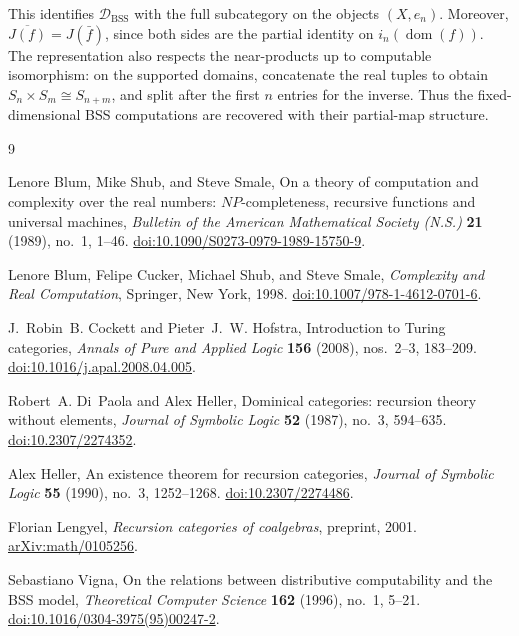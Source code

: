 \documentclass[11pt]{article}
\newcommand{\D}{\mathcal D_{\mathrm{BSS}}}
\newcommand{\dom}{\operatorname{dom}}
\begin{document}
This identifies $\D$ with the full subcategory on the objects
$(X,e_n)$. Moreover,
$\overline{J(f)}=J(\bar f)$, since both sides are the partial
identity on $i_n(\dom(f))$.
The representation also respects the near-products up to
computable isomorphism: on the supported domains, concatenate the
real tuples to obtain $S_n\times S_m\cong S_{n+m}$, and split after
the first $n$ entries for the inverse. Thus the fixed-dimensional
BSS computations are recovered with their partial-map structure.

\begin{thebibliography}{9}
\small
\setlength{\itemsep}{3pt}

Lenore Blum, Mike Shub, and Steve Smale,
On a theory of computation and complexity over the real numbers:
$NP$-completeness, recursive functions and universal machines,
\emph{Bulletin of the American Mathematical Society (N.S.)}
\textbf{21} (1989), no.~1, 1--46.
\href{https://doi.org/10.1090/S0273-0979-1989-15750-9}{doi:10.1090/S0273-0979-1989-15750-9}.

Lenore Blum, Felipe Cucker, Michael Shub, and Steve Smale,
\emph{Complexity and Real Computation},
Springer, New York, 1998.
\href{https://doi.org/10.1007/978-1-4612-0701-6}{doi:10.1007/978-1-4612-0701-6}.

J.~Robin~B. Cockett and Pieter~J.~W. Hofstra,
Introduction to Turing categories,
\emph{Annals of Pure and Applied Logic}
\textbf{156} (2008), nos.~2--3, 183--209.
\href{https://doi.org/10.1016/j.apal.2008.04.005}{doi:10.1016/j.apal.2008.04.005}.

Robert~A. Di~Paola and Alex Heller,
Dominical categories: recursion theory without elements,
\emph{Journal of Symbolic Logic} \textbf{52} (1987), no.~3, 594--635.
\href{https://doi.org/10.2307/2274352}{doi:10.2307/2274352}.

Alex Heller,
An existence theorem for recursion categories,
\emph{Journal of Symbolic Logic} \textbf{55} (1990), no.~3, 1252--1268.
\href{https://doi.org/10.2307/2274486}{doi:10.2307/2274486}.

Florian Lengyel,
\emph{Recursion categories of coalgebras},
preprint, 2001.
\href{https://arxiv.org/abs/math/0105256}{arXiv:math/0105256}.

Sebastiano Vigna,
On the relations between distributive computability and the BSS model,
\emph{Theoretical Computer Science} \textbf{162} (1996), no.~1, 5--21.
\href{https://doi.org/10.1016/0304-3975(95)00247-2}{doi:10.1016/0304-3975(95)00247-2}.

\end{thebibliography}
\end{document}
